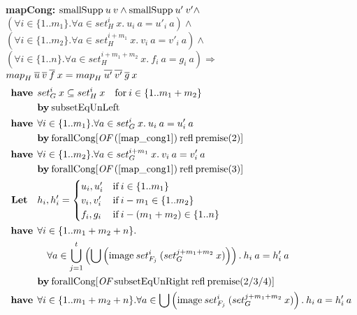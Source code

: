 \needspace{10em}
\textbf{mapCong:} $\text{smallSupp} \: u \: v \wedge \text{smallSupp} \: u' \: v' \wedge$ \\
\hspace*{1.7em} $(\forall i \in \{1..m_1\}. \forall a \in set_H^i \: x. \: u_i \: a = u'_i \: a) \wedge$ \\
\hspace*{1.7em} $(\forall i \in \{1..m_2\}. \forall a \in set_H^{i+m_1} \: x. \: v_i \: a = v'_i \: a) \wedge$ \\
\hspace*{1.7em} $(\forall i \in \{1..n\}. \forall a \in set_H^{i+m_1+m_2} \: x. \: f_i \: a = g_i \: a) \Longrightarrow$ \\
\hspace*{3em} ${map}_{H} \: \overline{u} \: \overline{v} \: \overline{f} \: x = {map}_{H} \: \overline{u'} \: \overline{v'} \: \overline{g} \: x$
\begin{align}
\have & set_G^i \: x \subseteq set_H^i \: x \quad \text{for} \: i \in \{1..m_1+m_2\} \label{map_cong1} \\
 & \by \text{subsetEqUnLeft} \nonumber \\
%
\have & \forall i \in \{1..m_1\}. \forall a \in set_G^i \: x. \: u_i \: a = u'_i \: a \label{map_cong2} \\
 & \by \OF{\text{forallCong}}{(\ref{map_cong1}) \: \text{refl} \: \text{premise(2)}} \nonumber \\
%
\have & \forall i \in \{1..m_2\}. \forall a \in set_G^{i+m_1} \: x. \: v_i \: a = v'_i \: a \label{map_cong3} \\
 & \by \OF{\text{forallCong}}{(\ref{map_cong1}) \: \text{refl} \: \text{premise(3)}} \nonumber \\
%
\textbf{Let} \quad & h_i, h'_i = \begin{cases}
u_i, u'_i & \text{if} \: i \in \{1..m_1\} \\
v_i, v'_i & \text{if} \: i - m_1 \in \{1..m_2\} \\
f_i, g_i & \text{if} \: i - (m_1+m_2) \in \{1..n\}
\end{cases} \nonumber \\
%
\have & \forall i \in \{1..m_1+m_2+n\}. \nonumber \\*
& \quad \forall a \in \bigcup_{j=1}^t \left( \bigcup \left( \text{image} \: set_{F_j}^i \: (set_G^{j+m_1+m_2} \: x) \right) \right). \: h_i \: a = h'_i \: a \label{map_cong5} \\
 & \by \OF{\text{forallCong}}{\text{subsetEqUnRight} \: \text{refl} \: \text{premise(2/3/4)}} \nonumber \\
%
\have & \forall i \in \{1..m_1+m_2+n\}. \forall a \in \bigcup \left( \text{image} \: set_{F_j}^i \: (set_G^{j+m_1+m_2} \: x) \right). \: h_i \: a = h'_i \: a \label{map_cong6} \\*

\end{align}
